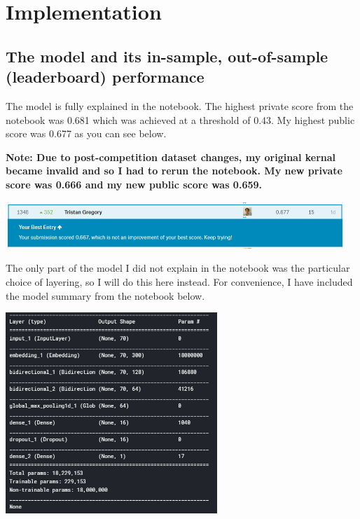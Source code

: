 \documentclass{article}
\begin{document}
\section{Implementation}
\subsection{The model and its in-sample, out-of-sample (leaderboard) performance}

The model is fully explained in the notebook. The highest private score from the notebook was 0.681 which was achieved at a threshold of 0.43. My highest public score was 0.677 as you can see below.

\textbf{Note: Due to post-competition dataset changes, my original kernal became invalid and so I had to rerun the notebook. My new private score was 0.666 and my new public score was 0.659.}

\begin{center}
\includegraphics[width=12.8cm]{leaderboard.png}
\end{center}

The only part of the model I did not explain in the notebook was the particular choice of layering, so I will do this here instead. For convenience, I have included the model summary from the notebook below.

\begin{center}
\includegraphics[width=8cm]{summary.png}
\end{center}
\end{document}
